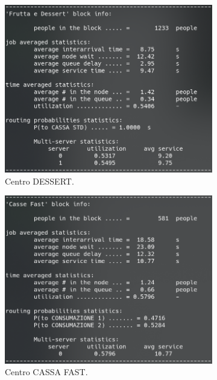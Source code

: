 \documentclass{article}
\begin{document}
\begin{figure}[H]
\begin{subfigure}{.5\textwidth}
\end{subfigure}
\begin{subfigure}{.5\textwidth}
  \centering
  \includegraphics[width=.9\linewidth]{img/migliorativo_2_2/dessert.png}
  \caption{Centro DESSERT.}
  \label{fig:dessert_ext_2_plo_2}
\end{subfigure}
\begin{subfigure}{.5\textwidth}
  \centering
  \includegraphics[width=.88\linewidth]{img/migliorativo_2_2/fast.png}
  \caption{Centro CASSA FAST.}
  \label{fig:cassa_fast_ext_2_pol_2}
\end{subfigure}
\begin{subfigure}{.5\textwidth}
  \centering

\end{subfigure}
\end{figure}
\end{document}
